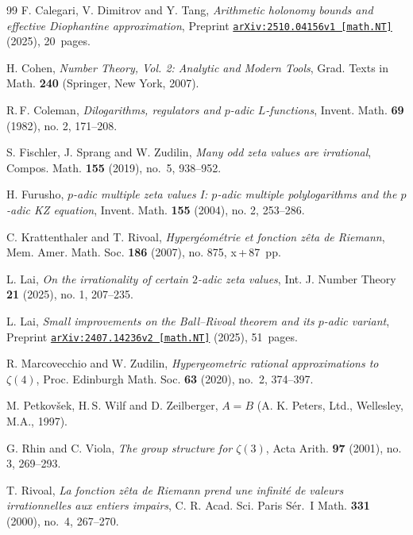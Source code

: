 \documentclass[12pt]{article}
\theoremstyle{remark}
\numberwithin{equation}{section}
\begin{document}
\begin{thebibliography}{99}
 F. Calegari, V. Dimitrov and Y. Tang,
\textit{Arithmetic holonomy bounds and effective Diophantine approximation},
Preprint \href{https://arxiv.org/abs/2510.04156v1}{{\tt arXiv:2510.04156v1 [math.NT]}} (2025), 20~pages.

 H. Cohen, \textit{Number Theory, Vol. 2: Analytic and Modern Tools}, Grad. Texts in Math. \textbf{240} (Springer, New York, 2007).

 R.\,F. Coleman, \textit{Dilogarithms, regulators and $p$-adic $L$-functions}, Invent. Math. \textbf{69} (1982), no. 2, 171--208.

  S. Fischler, J. Sprang and W. Zudilin, \textit{Many odd zeta values are irrational}, Compos. Math. \textbf{155} (2019), no.~5, 938--952.

 H. Furusho, \textit{$p$-adic multiple zeta values I: $p$-adic multiple polylogarithms and the $p$-adic KZ equation}, Invent. Math. \textbf{155} (2004), no. 2, 253--286.

 C. Krattenthaler and T. Rivoal, \textit{Hyperg\'eom\'etrie et fonction z\^eta de Riemann}, Mem. Amer. Math. Soc. \textbf{186} (2007), no. 875, x\,+\,87~pp.

 L. Lai, \textit{On the irrationality of certain $2$-adic zeta values}, Int. J. Number Theory \textbf{21} (2025), no. 1, 207--235.

 L. Lai, \textit{Small improvements on the Ball--Rivoal theorem and its $p$-adic variant}, Preprint \href{https://arxiv.org/abs/2407.14236v2}{{\tt arXiv:2407.14236v2 [math.NT]}} (2025), 51~pages.

 R. Marcovecchio and W. Zudilin,
\textit{Hypergeometric rational approximations to $\zeta(4)$},
Proc. Edinburgh Math. Soc. \textbf{63} (2020), no.~2, 374--397.

 M. Petkov\v sek, H.\,S. Wilf and D. Zeilberger, \textit{$A = B$} (A. K. Peters, Ltd., Wellesley, M.A., 1997).

 G. Rhin and C. Viola, \textit{The group structure for $\zeta(3)$}, Acta Arith. \textbf{97} (2001), no. 3, 269--293.

 T. Rivoal, \textit{La fonction z\^eta de Riemann prend une infinit\'e de valeurs irrationnelles aux entiers impairs},  C. R. Acad. Sci. Paris S\'er.~I Math. \textbf{331} (2000), no.~4, 267--270.


\end{thebibliography}
\end{document}
